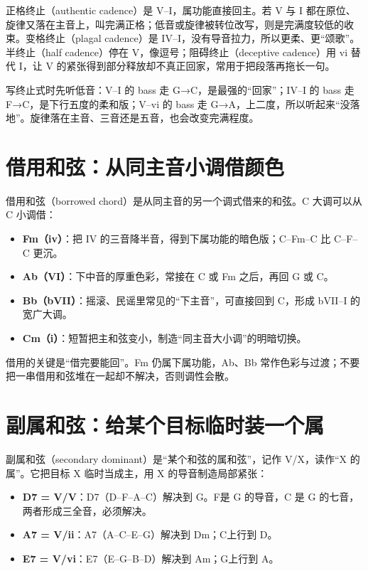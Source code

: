 正格终止（authentic cadence）是 V–I，属功能直接回主。若 V 与 I 都在原位、旋律又落在主音上，叫完满正格；低音或旋律被转位改写，则是完满度较低的收束。变格终止（plagal cadence）是 IV–I，没有导音拉力，所以更柔、更“颂歌”。半终止（half cadence）停在 V，像逗号；阻碍终止（deceptive cadence）用 vi 替代 I，让 V 的紧张得到部分释放却不真正回家，常用于把段落再拖长一句。

写终止式时先听低音：V–I 的 bass 走 G→C，是最强的“回家”；IV–I 的 bass 走 F→C，是下行五度的柔和版；V–vi 的 bass 走 G→A，上二度，所以听起来“没落地”。旋律落在主音、三音还是五音，也会改变完满程度。

\section{借用和弦：从同主音小调借颜色}

借用和弦（borrowed chord）是从同主音的另一个调式借来的和弦。C 大调可以从 C 小调借：

\begin{itemize}
  \item \textbf{Fm（iv）}：把 IV 的三音降半音，得到下属功能的暗色版；C–Fm–C 比 C–F–C 更沉。
  \item \textbf{Ab（VI）}：下中音的厚重色彩，常接在 C 或 Fm 之后，再回 G 或 C。
  \item \textbf{Bb（bVII）}：摇滚、民谣里常见的“下主音”，可直接回到 C，形成 bVII–I 的宽广大调。
  \item \textbf{Cm（i）}：短暂把主和弦变小，制造“同主音大小调”的明暗切换。
\end{itemize}

借用的关键是“借完要能回”。Fm 仍属下属功能，Ab、Bb 常作色彩与过渡；不要把一串借用和弦堆在一起却不解决，否则调性会散。

\section{副属和弦：给某个目标临时装一个属}

副属和弦（secondary dominant）是“某个和弦的属和弦”，记作 V/X，读作“X 的属”。它把目标 X 临时当成主，用 X 的导音制造局部紧张：

\begin{itemize}
  \item \textbf{D7 = V/V}：D7（D–F\sharpsym–A–C）解决到 G。F\sharpsym 是 G 的导音，C 是 G 的七音，两者形成三全音，必须解决。
  \item \textbf{A7 = V/ii}：A7（A–C\sharpsym–E–G）解决到 Dm；C\sharpsym 上行到 D。
  \item \textbf{E7 = V/vi}：E7（E–G\sharpsym–B–D）解决到 Am；G\sharpsym 上行到 A。
\end{itemize}

